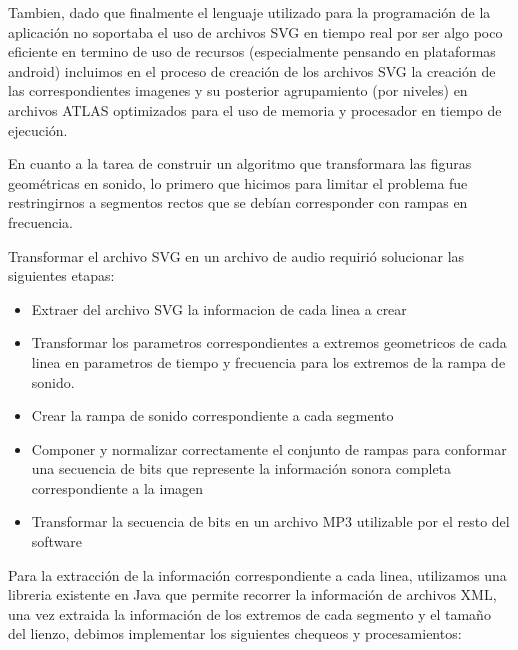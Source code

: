 \documentclass{article}
\begin{document}
    Tambien, dado que finalmente el lenguaje utilizado para la programación de la aplicación no soportaba el uso de archivos SVG en tiempo real por ser algo poco eficiente en termino de uso de recursos (especialmente pensando en plataformas android) incluimos en el proceso de creación de los archivos SVG la creación de las correspondientes imagenes y su posterior agrupamiento (por niveles) en archivos ATLAS optimizados para el uso de memoria y procesador en tiempo de ejecución.
    
    En cuanto a la tarea de construir un algoritmo que transformara las figuras geométricas en sonido, lo primero que hicimos para limitar el problema fue restringirnos a segmentos rectos que se debían corresponder con rampas en frecuencia.
    
    Transformar el archivo SVG en un archivo de audio requirió solucionar las siguientes etapas:
    
    \begin{itemize}
        \item Extraer del archivo SVG la informacion de cada linea a crear
        \item Transformar los parametros correspondientes a extremos geometricos de cada linea en parametros de tiempo y frecuencia para los extremos de la rampa de sonido.
        \item Crear la rampa de sonido correspondiente a cada segmento
        \item Componer y normalizar correctamente el conjunto de rampas para conformar una secuencia de bits que represente la información sonora completa correspondiente a la imagen
        \item Transformar la secuencia de bits en un archivo MP3 utilizable por el resto del software
    \end{itemize}
    
    Para la extracción de la información correspondiente a cada linea, utilizamos una libreria existente en Java que permite recorrer la información de archivos XML, una vez extraida la información de los extremos de cada segmento y el tamaño del lienzo, debimos implementar los siguientes chequeos y procesamientos:
    
\end{document}
